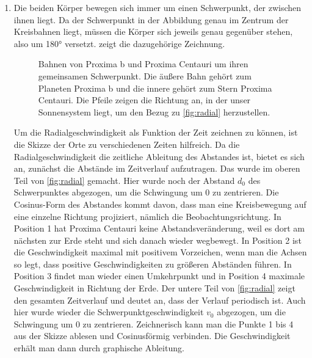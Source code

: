 \begin{enumerate}
	\item Die beiden Körper bewegen sich immer um einen Schwerpunkt, der zwischen ihnen liegt. Da der Schwerpunkt in der Abbildung genau im Zentrum der Kreisbahnen liegt, müssen die Körper sich jeweils genau gegenüber stehen, also um \ang{180} versetzt.  zeigt die dazugehörige Zeichnung.
	\begin{figure}
		\centering
		\caption{Bahnen von Proxima b und Proxima Centauri um ihren gemeinsamen Schwerpunkt. Die äußere Bahn gehört zum Planeten Proxima b und die innere gehört zum Stern Proxima Centauri. Die Pfeile zeigen die Richtung an, in der unser Sonnensystem liegt, um den Bezug zu \cref{fig:radial} herzustellen.}
		\label{fig:Position}
	\end{figure}
	
	Um die Radialgeschwindigkeit als Funktion der Zeit zeichnen zu können, ist die Skizze der Orte zu verschiedenen Zeiten hilfreich. Da die Radialgeschwindigkeit die zeitliche Ableitung des Abstandes ist, bietet es sich an, zunächst die Abstände im Zeitverlauf aufzutragen.
	Das wurde im oberen Teil von \cref{fig:radial} gemacht. Hier wurde noch der Abstand $d_0$ des Schwerpunktes abgezogen, um die Schwingung um 0 zu zentrieren. Die Cosinus-Form des Abstandes kommt davon, dass man eine Kreisbewegung auf eine einzelne Richtung projiziert, nämlich die Beobachtungsrichtung. In Position 1 hat Proxima Centauri keine Abstandsveränderung, weil es dort am nächsten zur Erde steht und sich danach wieder wegbewegt. In Position 2 ist die Geschwindigkeit maximal mit positivem Vorzeichen, wenn man die Achsen so legt, dass positive Geschwindigkeiten zu größeren Abständen führen. In Position 3 findet man wieder einen Umkehrpunkt und in Position 4 maximale Geschwindigkeit in Richtung der Erde. Der untere Teil von \cref{fig:radial} zeigt den gesamten Zeitverlauf und deutet an, dass der Verlauf periodisch ist. Auch hier wurde wieder die Schwerpunktgeschwindigkeit $v_0$ abgezogen, um die Schwingung um 0 zu zentrieren. Zeichnerisch kann man die Punkte 1 bis 4 aus der Skizze ablesen und Cosinusförmig verbinden. Die Geschwindigkeit erhält man dann durch graphische Ableitung.




\end{enumerate}
